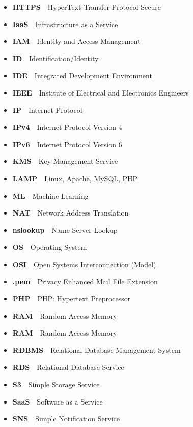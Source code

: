 \begin{itemize}
    \item  \textbf{HTTPS}~\textemdash~HyperText Transfer Protocol Secure
    \item  \textbf{IaaS}~\textemdash~Infrastructure as a Service
    \item  \textbf{IAM}~\textemdash~Identity and Access Management
    \item  \textbf{ID}~\textemdash~Identification/Identity
    \item  \textbf{IDE}~\textemdash~Integrated Development Environment
    \item  \textbf{IEEE}~\textemdash~Institute of Electrical and Electronics Engineers
    \item  \textbf{IP}~\textemdash~Internet Protocol
    \item  \textbf{IPv4}~\textemdash~Internet Protocol Version 4
    \item  \textbf{IPv6}~\textemdash~Internet Protocol Version 6
    \item  \textbf{KMS}~\textemdash~Key Management Service
    \item  \textbf{LAMP}~\textemdash~Linux, Apache, MySQL, PHP
    \item  \textbf{ML}~\textemdash~Machine Learning
    \item  \textbf{NAT}~\textemdash~Network Address Translation
    \item  \textbf{nslookup}~\textemdash~Name Server Lookup
    \item  \textbf{OS}~\textemdash~Operating System
    \item  \textbf{OSI}~\textemdash~Open Systems Interconnection (Model)
    \item  \textbf{.pem}~\textemdash~Privacy Enhanced Mail File Extension
    \item  \textbf{PHP}~\textemdash~PHP: Hypertext Preprocessor
    \item  \textbf{RAM}~\textemdash~Random Access Memory
    \item  \textbf{RAM}~\textemdash~Random Access Memory
    \item  \textbf{RDBMS}~\textemdash~Relational Database Management System
    \item  \textbf{RDS}~\textemdash~Relational Database Service
    \item  \textbf{S3}~\textemdash~Simple Storage Service
    \item  \textbf{SaaS}~\textemdash~Software as a Service
    \item  \textbf{SNS}~\textemdash~Simple Notification Service

\end{itemize}
